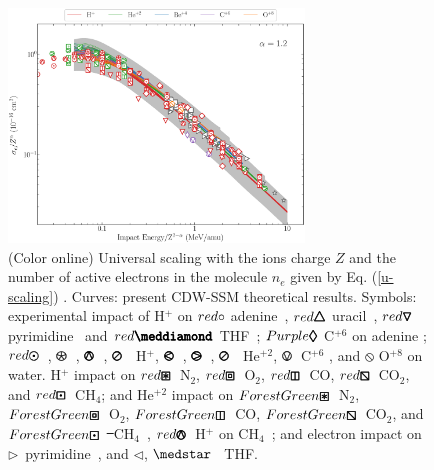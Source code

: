\documentclass[10pt,showpacs,showkeys,twocolumn]{revtex4-1} %
\providecommand{\DIFadd}[1]{{\protect\color{blue}\uwave{#1}}} %
\providecommand{\DIFdel}[1]{{\protect\color{red}\sout{#1}}}                      %
\providecommand{\DIFaddFL}[1]{\DIFadd{#1}} %
\providecommand{\DIFdelFL}[1]{\DIFdel{#1}} %
\providecommand{\DIFaddbeginFL}{} %
\providecommand{\DIFaddendFL}{} %
\providecommand{\DIFdelbeginFL}{} %
\providecommand{\DIFdelendFL}{} %
\newcommand{\DIFscaledelfig}{0.5}
\newlength{\DIFdelgraphicswidth} %
\newlength{\DIFdelgraphicsheight} %
\newcommand{\DIFaddincludegraphics}[2][]{{\color{blue}\fbox{\DIFOincludegraphics[#1]{#2}}}} %
\newcommand{\DIFdelincludegraphics}[2][]{%
\sbox{\DIFdelgraphicsbox}{\DIFOincludegraphics[#1]{#2}}%
\settoboxwidth{\DIFdelgraphicswidth}{\DIFdelgraphicsbox} %
\settoboxtotalheight{\DIFdelgraphicsheight}{\DIFdelgraphicsbox} %
\scalebox{\DIFscaledelfig}{%
\parbox[b]{\DIFdelgraphicswidth}{\usebox{\DIFdelgraphicsbox}\\[-\baselineskip] \rule{\DIFdelgraphicswidth}{0em}}\llap{\resizebox{\DIFdelgraphicswidth}{\DIFdelgraphicsheight}{%
\setlength{\unitlength}{\DIFdelgraphicswidth}%
\begin{picture}(1,1)%
\thicklines\linethickness{2pt} %
{\color[rgb]{1,0,0}\put(0,0){\framebox(1,1){}}}%
{\color[rgb]{1,0,0}\put(0,0){\line( 1,1){1}}}%
{\color[rgb]{1,0,0}\put(0,1){\line(1,-1){1}}}%
\end{picture}%
}\hspace*{3pt}}} %
} %
\DeclareRobustCommand{\DIFaddbeginFL}{\DIFOaddbeginFL \let\includegraphics\DIFaddincludegraphics} %
\DeclareRobustCommand{\DIFaddendFL}{\DIFOaddendFL \let\includegraphics\DIFOincludegraphics} %
\DeclareRobustCommand{\DIFdelbeginFL}{\DIFOdelbeginFL \let\includegraphics\DIFdelincludegraphics} %
\DeclareRobustCommand{\DIFdelendFL}{\DIFOaddendFL \let\includegraphics\DIFOincludegraphics} %
\begin{document}
\begin{figure}[!t]%
\centering
\includegraphics[width=0.7\textwidth]{zmol_werror.eps}
\caption{(Color online) Universal scaling with the ions charge $Z$ and 
the number of active electrons in the molecule $n_e$ given by Eq. 
(\ref{u-scaling}) \DIFaddbeginFL \DIFaddFL{with $\alpha=1.2$}\DIFaddendFL . Curves: present CDW-SSM theoretical 
results. Symbols: experimental impact of H$^+$ on 
\mbox{\LARGE$\color{red}\circ$} adenine~\cite{iriki2011}, 
{\fontsize{11}{20}$\color{red}\pmb{\triangle}$} uracil~\cite{itoh2013}, 
{\fontsize{11}{20}$\color{red}\pmb{\triangledown}$} pyrimidine~\cite{wolff2014} and 
{\fontsize{10}{20}$\color{red}\pmb{\meddiamond}$} THF~\cite{wang2016};
{\fontsize{11}{20}$\color{Purple}\pmb{\lozenge}$} C$^{+6}$ on adenine \cite{tribedi2019};
\mbox{\fontsize{11}{20}$\color{red}\pmb{\odot}$}~\cite{Luna2007}, 
{\fontsize{11}{20}\color{red}$\pmb{\logof}$}~\cite{Rudd86}, 
{\fontsize{11}{20}\color{red}$\pmb{\varowedge}$}~\cite{pRudd85}, 
{\fontsize{11}{20}\color{red}$\pmb{\varoslash}$}~\cite{toburen80} H$^+$,
{\fontsize{11}{20}\color{ForestGreen}$\pmb{\varolessthan}$}~\cite{Ohsawa05},
{\fontsize{11}{20}\color{ForestGreen}$\pmb{\varogreaterthan}$}~\cite{Rudd85},
{\fontsize{11}{20}\color{ForestGreen}$\pmb{\varoslash}$}~\cite{toburen80} He$^{+2}$,
{\fontsize{11}{20}\color{Purple}$\pmb{\ovee}$}~C$^{+6}$ \cite{DalCappello2009,Bhattacharjee17}, and 
{\fontsize{11}{20}\color{BurntOrange}$\pmb{\obslash}$}
O$^{+8}$ \cite{Tribedi_O_water} on water.
H$^{+}$ impact on 
{\fontsize{11}{20}${\color{red}\pmb{\boxast}}$}~N$_2$, 
{\fontsize{11}{20}${\color{red}\pmb{\boxbox}}$}~O$_2$, 
{\fontsize{11}{20}${\color{red}\pmb{\boxbar}}$}~CO, 
{\fontsize{11}{20}${\color{red}\pmb{\boxbslash}}$}~CO$_2$, and
{\fontsize{11}{20}${\color{red}\pmb{\boxdot}}$}~CH$_4$; 
and He$^{+2}$ impact on 
{\fontsize{11}{20}${\color{ForestGreen}\pmb{\boxast}}$}~N$_2$,
{\fontsize{11}{20}${\color{ForestGreen}\pmb{\boxbox}}$}~O$_2$, 
{\fontsize{11}{20}${\color{ForestGreen}\pmb{\boxbar}}$}~CO, 
{\fontsize{11}{20}${\color{ForestGreen}\pmb{\boxbslash}}$}~CO$_2$, and
{\fontsize{11}{20}${\color{ForestGreen}\pmb{\boxdot}}$} 
\DIFdelbeginFL \DIFdelFL{~}\DIFdelendFL CH$_4$~\cite{Rudd85,Rudd1983}, 
{\fontsize{11}{20}${\color{red}\pmb{\varowedge}}$}~H$^{+}$ on 
CH$_4$~\cite{Luna2019}; 
and electron impact on $\rhd$~pyrimidine~\cite{bug2017}, and $\lhd$, 
$\medstar$~\cite{wolf2019,fuss2009} THF.}
\label{fig:zalpha}
\end{figure} 
\end{document}
